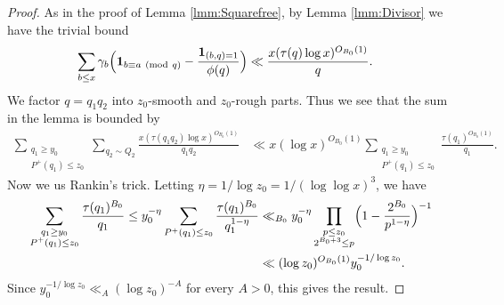 \documentclass[10pt]{amsart}
\theoremstyle{plain}
\numberwithin{equation}{section}
\newcommand{\Mod}[1]{\ (\mathrm{mod}\ #1)}
\begin{document}
\begin{proof}
As in the proof of Lemma \ref{lmm:Squarefree}, by Lemma \ref{lmm:Divisor} we have the trivial bound
\begin{align*}
\sum_{b\le x}\gamma_b\Bigl(\mathbf{1}_{b\equiv a\Mod{q}}-\frac{\mathbf{1}_{(b,q)=1}}{\phi(q)}\Bigr)&\ll \frac{x(\tau(q)\log{x})^{O_{B_0}(1)}}{q}.
\end{align*}
We factor $q=q_1q_2$ into $z_0$-smooth and $z_0$-rough parts. Thus we see that the sum in the lemma is bounded by
\begin{align*}
\sum_{\substack{q_1\ge y_0\\ P^+(q_1)\le z_0}}\sum_{q_2\sim Q_2}\frac{x(\tau(q_1q_2)\log{x})^{O_{B_0}(1)}}{q_1q_2}&\ll x(\log{x})^{O_{B_0}(1)}\sum_{\substack{q_1\ge y_0\\ P^+(q_1)\le z_0}}\frac{\tau(q_1)^{O_{B_0}(1)}}{q_1}.
\end{align*}
Now we us Rankin's trick. Letting $\eta=1/\log{z_0}=1/(\log\log{x})^3$, we have
\begin{align*}
\sum_{\substack{q_1\ge y_0\\ P^+(q_1)\le z_0}}\frac{\tau(q_1)^{B_0}}{q_1}\le y_0^{-\eta}\sum_{P^+(q_1)\le z_0}\frac{\tau(q_1)^{B_0}}{q_1^{1-\eta}}&\ll_{B_0}  y_0^{-\eta}\prod_{\substack{p\le z_0\\ 2^{B_0+3}\le p}}\Bigl(1-\frac{2^{B_0}}{p^{1-\eta}}\Bigr)^{-1}\\
&\ll (\log{z_0})^{O_{B_0}(1)} y_0^{-1/\log{z_0}}.
\end{align*}
Since $y_0^{-1/\log{z_0}}\ll_A (\log{z_0})^{-A}$ for every $A>0$, this gives the result.
\end{proof}
%
%
%
%
%
%
%
%
%
%
%
%
%
%
%
%
%
%
\end{document}
